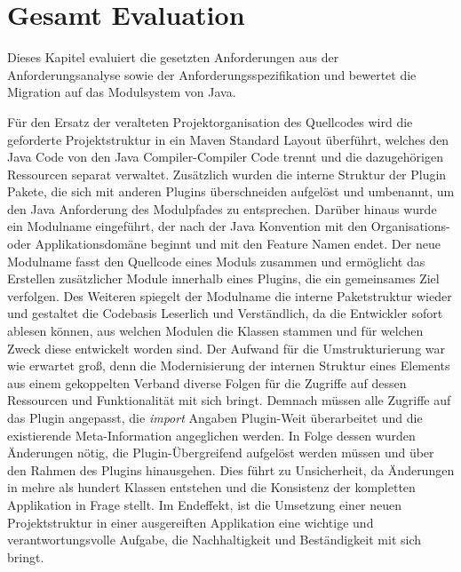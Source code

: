 \chapter{Gesamt Evaluation}
Dieses Kapitel evaluiert die gesetzten Anforderungen aus der Anforderungsanalyse sowie der Anforderungsspezifikation und bewertet die Migration auf das Modulsystem von Java.\bigbreak	

Für den Ersatz der veralteten Projektorganisation des Quellcodes wird die geforderte Projektstruktur in ein Maven Standard Layout überführt, welches den Java Code von den Java Compiler-Compiler Code trennt und die dazugehörigen Ressourcen separat verwaltet. Zusätzlich wurden die interne Struktur der Plugin Pakete, die sich mit anderen Plugins überschneiden aufgelöst und umbenannt, um den Java Anforderung des Modulpfades zu entsprechen. Darüber hinaus wurde ein Modulname eingeführt, der nach der Java Konvention mit den Organisations- oder Applikationsdomäne beginnt und mit den Feature Namen endet. Der neue Modulname fasst den Quellcode eines Moduls zusammen und ermöglicht das Erstellen zusätzlicher Module innerhalb eines Plugins, die ein gemeinsames Ziel verfolgen. Des Weiteren spiegelt der Modulname die interne Paketstruktur wieder und gestaltet die Codebasis Leserlich und Verständlich, da die Entwickler sofort ablesen können, aus welchen Modulen die Klassen stammen und für welchen Zweck diese entwickelt worden sind.\newline
Der Aufwand für die Umstrukturierung war wie erwartet groß, denn die Modernisierung der internen Struktur eines Elements aus einem gekoppelten Verband diverse Folgen für die Zugriffe auf dessen Ressourcen und Funktionalität mit sich bringt. Demnach müssen alle Zugriffe auf das Plugin angepasst, die \textit{import} Angaben Plugin-Weit überarbeitet und die existierende Meta-Information angeglichen werden. In Folge dessen wurden Änderungen nötig, die Plugin-Übergreifend aufgelöst werden müssen und über den Rahmen des Plugins hinausgehen. Dies führt zu Unsicherheit, da Änderungen in mehre als hundert Klassen entstehen und die Konsistenz der kompletten Applikation in Frage stellt. \newline
Im Endeffekt, ist die Umsetzung einer neuen Projektstruktur in einer ausgereiften Applikation eine wichtige und verantwortungsvolle Aufgabe, die  Nachhaltigkeit und Beständigkeit mit sich bringt.\bigbreak    

